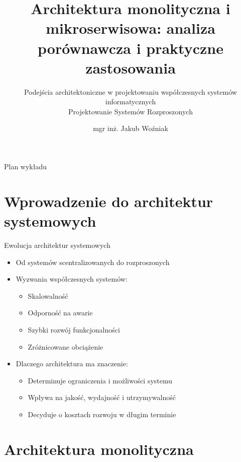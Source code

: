 \documentclass[aspectratio=169,xcolor=table]{beamer}
\title{Architektura monolityczna i mikroserwisowa: analiza porównawcza i praktyczne zastosowania}
\subtitle{Podejścia architektoniczne w projektowaniu współczesnych systemów informatycznych\\Projektowanie Systemów Rozproszonych}
\author{mgr inż. Jakub Woźniak}
\institute[PUT]{Zakład Systemów Informatycznych\\Instytut Informatyki Politechniki Poznańskiej}
\date{}
\begin{document}
\begin{frame}
  \titlepage
\end{frame}

\begin{frame}{Plan wykładu}
  \tableofcontents
\end{frame}

\section{Wprowadzenie do architektur systemowych}

\begin{frame}{Ewolucja architektur systemowych}
  \begin{itemize}
    \item Od systemów scentralizowanych do rozproszonych
    \item Wyzwania współczesnych systemów:
      \begin{itemize}
        \item Skalowalność
        \item Odporność na awarie
        \item Szybki rozwój funkcjonalności
        \item Zróżnicowane obciążenie
      \end{itemize}
    \item Dlaczego architektura ma znaczenie:
      \begin{itemize}
        \item Determinuje ograniczenia i możliwości systemu
        \item Wpływa na jakość, wydajność i utrzymywalność
        \item Decyduje o kosztach rozwoju w długim terminie
      \end{itemize}
  \end{itemize}
\end{frame}

\section{Architektura monolityczna}
\end{document}
